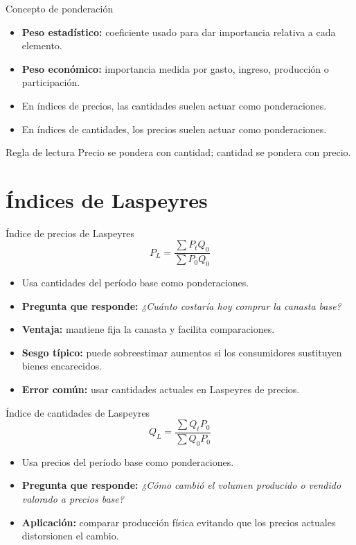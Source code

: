 \documentclass[aspectratio=169,11pt]{beamer}
\newcommand{\pregunta}[1]{\textbf{Pregunta que responde:} \emph{#1}}
\newcommand{\errorcomun}[1]{\textbf{Error común:} #1}
\begin{document}
\begin{frame}{Concepto de ponderación}
\begin{itemize}
  \item \textbf{Peso estadístico:} coeficiente usado para dar importancia relativa a cada elemento.
  \item \textbf{Peso económico:} importancia medida por gasto, ingreso, producción o participación.
  \item En índices de precios, las cantidades suelen actuar como ponderaciones.
  \item En índices de cantidades, los precios suelen actuar como ponderaciones.
\end{itemize}
\begin{block}{Regla de lectura}
Precio se pondera con cantidad; cantidad se pondera con precio.
\end{block}
\end{frame}

\section{Índices de Laspeyres}

\begin{frame}{Índice de precios de Laspeyres}
\[
P_L=\frac{\sum P_tQ_0}{\sum P_0Q_0}
\]
\begin{itemize}
  \item Usa cantidades del período base como ponderaciones.
  \item \pregunta{¿Cuánto costaría hoy comprar la canasta base?}
  \item \textbf{Ventaja:} mantiene fija la canasta y facilita comparaciones.
  \item \textbf{Sesgo típico:} puede sobreestimar aumentos si los consumidores sustituyen bienes encarecidos. 
  \item \errorcomun{usar cantidades actuales en Laspeyres de precios.}
\end{itemize}
\end{frame}

\begin{frame}{Índice de cantidades de Laspeyres}
\[
Q_L=\frac{\sum Q_tP_0}{\sum Q_0P_0}
\]
\begin{itemize}
  \item Usa precios del período base como ponderaciones.
  \item \pregunta{¿Cómo cambió el volumen producido o vendido valorado a precios base?}
  \item \textbf{Aplicación:} comparar producción física evitando que los precios actuales distorsionen el cambio.
\end{itemize}
\end{frame}
\end{document}
